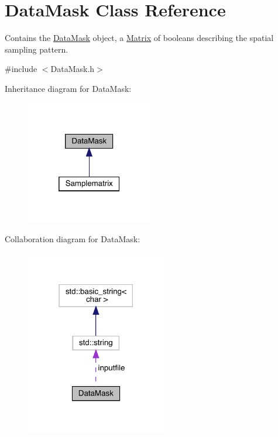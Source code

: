 \hypertarget{class_data_mask}{}\section{Data\+Mask Class Reference}
\label{class_data_mask}


Contains the \hyperlink{class_data_mask}{Data\+Mask} object, a \hyperlink{class_matrix}{Matrix} of booleans describing the spatial sampling pattern.  




{\ttfamily \#include $<$Data\+Mask.\+h$>$}



Inheritance diagram for Data\+Mask\+:
\nopagebreak
\begin{figure}[H]
\begin{center}
\leavevmode
\includegraphics[width=157pt]{class_data_mask__inherit__graph}
\end{center}
\end{figure}


Collaboration diagram for Data\+Mask\+:
\nopagebreak
\begin{figure}[H]
\begin{center}
\leavevmode
\includegraphics[width=174pt]{class_data_mask__coll__graph}
\end{center}
\end{figure}
